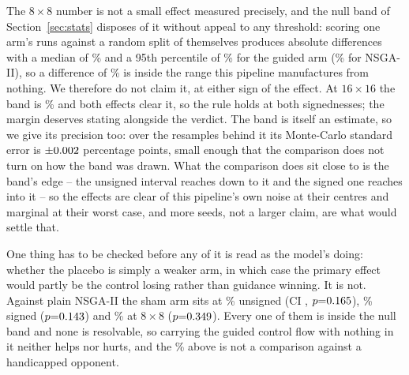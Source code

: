 \documentclass[acmsmall,review,anonymous]{acmart}
\begin{document}
The $8\times8$ number is not a small effect measured precisely, and the null
band of Section~\ref{sec:stats} disposes of it without appeal to any threshold:
scoring one arm's runs against a random split of themselves produces absolute
differences with a median of \NullEightMed\% and a 95th percentile of
\NullEight\% for the guided arm (\NullEightN\% for NSGA-II), so a difference of
\ShamEight\% is inside the range this pipeline manufactures from nothing.  We
therefore do not claim it, at either sign of the effect.  At $16\times16$ the
band is \NullSixteen\% and both effects clear it, so the rule holds at both
signednesses; the margin deserves stating alongside the verdict.  The band is
itself an estimate, so we give its precision too: over the resamples behind it
its Monte-Carlo standard error is $\pm0.002$ percentage points, small
enough that the comparison does not turn on how the band was drawn.  What the
comparison does sit close to is the band's edge -- the unsigned interval reaches
down to it and the signed one reaches into it -- so the effects are clear of
this pipeline's own noise at their centres and marginal at their worst case,
and more seeds, not a larger claim, are what would settle that.

One thing has to be checked before any of it is read as the model's doing:
whether the placebo is simply a weaker arm, in which case the primary effect
would partly be the control losing rather than guidance winning.  It is not.
Against plain NSGA-II the sham arm sits at \ShamNsgaU\% unsigned (CI
\ShamNsgaUCI, $p{=}0.165$), \ShamNsgaS\% signed ($p{=}0.143$) and
\ShamNsgaEight\% at $8\times8$ ($p{=}0.349$).  Every one of them is
inside the null band and none is resolvable, so carrying the guided control
flow with nothing in it neither helps nor hurts, and the \ShamSixteenU\% above
is not a comparison against a handicapped opponent.
\end{document}
